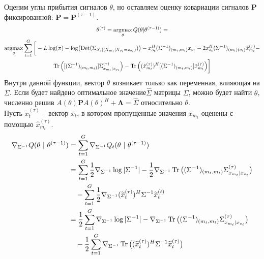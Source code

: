 \documentclass[11pt]{article}
\DeclareMathOperator*{\argmax}{argmax}
\DeclareMathOperator{\Det}{Det}
\begin{document}
\begin{center}
\fontsize{14}{18}\selectfont {}
\end{center}
Оценим углы прибытия сигналов $\theta$, но оставляем оценку ковариации сигналов $\mathbf{P}$ фиксированной: $\mathbf{P} = \mathbf{P}^{(\tau-1)}$.
\begin{equation*}
\begin{gathered}
\theta^{(\tau)}= \argmax_{\theta} Q(\theta | \theta^{(\tau-1)}) = \\
\argmax_{\theta} \sum_{t=1}^G \bigg[-L \log(\pi) - \log (\Det(\Sigma_{X_t|(X_{m_t}|X_{o_t}=x_{o_t})})) - x_{o_t}^H (\Sigma^{-1})_{(m_t, m_t)}x_{o_t} - 2 x_{o_t}^H (\Sigma^{-1})_{(m_t)(o_t)}\hat{x}_{m_t}^{(\tau)} - \\ \Tr \Big( [(\Sigma^{-1})_{(m_t, m_t)}]\Sigma^{(\tau)}_{x_{m_t}|x_{o_t}} \Big) - \Tr \Big((\hat{x}_{m_t}^{(\tau)})^H[(\Sigma^{-1})_{(m_t, m_t)}]\hat{x}_{m_t}^{(\tau)} \Big) \bigg]
\end{gathered}
\end{equation*}
Внутри данной функции, вектор $\theta$ возникает только как переменная, влияющая на $\Sigma$. Если будет найдено оптимальное значение$\hat{\Sigma}$ матрицы $\Sigma$, можно будет найти $\theta$, 
численно решив $A(\theta) \mathbf{P}A(\theta)^H + \mathbf{\Lambda} = \hat{\Sigma}$ относительно $\theta$. \\
Пусть $\widetilde{x}_t^{(\tau)}$ -- вектор $x_t$, в котором пропущенные значения $x_{m_t}$ оценены с помощью $\hat{x}_{m_t}^{(\tau)}$.
\begin{align*}
\nabla_{\Sigma^{-1}} Q(\theta \text{ | } \theta^{(\tau-1)}) &= \sum_{t = 1}^{G} \nabla_{\Sigma^{-1}} Q_t (\theta \text{ | } \theta^{(\tau-1)}) \\
&= \sum_{t = 1}^{G} \frac{1}{2} \nabla_{\Sigma^{-1}} \log |\Sigma^{-1}| - \frac{1}{2} \nabla_{\Sigma^{-1}} \Tr \big( (\Sigma^{-1})_{(m_t, m_t)} \Sigma^{(\tau)}_{x_{m_t}|x_{o_t}} \big) \\
&\hspace{10pt} - \sum_{t = 1}^{G} \frac{1}{2} \nabla_{\Sigma^{-1}} (\widetilde{x}_t^{(\tau)})^H \Sigma^{-1} \widetilde{x}_t^{(t)} \\
&= \frac{1}{2} \sum_{t = 1}^{G} \nabla_{\Sigma^{-1}} \log |\Sigma^{-1}| - \nabla_{\Sigma^{-1}} \Tr \big( (\Sigma^{-1})_{(m_t, m_t)} \Sigma^{(\tau)}_{x_{m_t}|x_{o_t}} \big) \\
&\hspace{10pt} - \frac{1}{2} \sum_{t = 1}^{G} \nabla_{\Sigma^{-1}} \Tr \big( (\widetilde{x}_t^{(\tau)})^H \Sigma^{-1} \widetilde{x}_t^{(\tau)} \big)
\end{align*}
\end{document}
